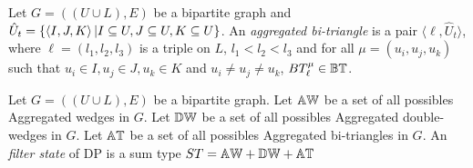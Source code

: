 %
\begin{definition}
Let $G=((U\cup L),E)$ be a bipartite graph and  $\hat{U}_t=\{\left\langle I, J, K\right\rangle | I \subseteq U, J \subseteq U, K \subseteq U\}$. An \textit{aggregated bi-triangle}  is a pair  $\langle \ell, \hat{U}_t\rangle$, where $\ell=(l_1, l_2, l_3)$ is a triple on $L$, $l_1 < l_2 < l_3$ and for all $\mu=(u_i, u_j, u_k)$ such that $u_i \in I, u_j \in J, u_k \in K$ and $u_i \neq u_j \neq u_k$, $BT_{\ell}^{\mu}\in \mathbb{BT}$.
\end{definition}
%
%
\begin{definition}
Let $G=((U\cup L),E)$ be a bipartite graph. 
Let $\mathbb{AW}$ be a set of all possibles Aggregated wedges in $G$.
Let $\mathbb{DW}$ be a set of all possibles Aggregated double-wedges in $G$.
Let $\mathbb{AT}$ be a set of all possibles Aggregated bi-triangles in $G$.
An \textit{filter state} of DP is a sum type $ST = \mathbb{AW} + \mathbb{DW} + \mathbb{AT}$
\end{definition}
%

